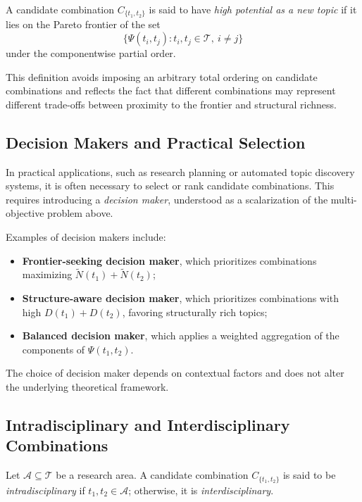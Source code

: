 \begin{definition}
A candidate combination $C_{\{t_1,t_2\}}$ is said to have \emph{high potential as a new topic} if it lies on the Pareto frontier of the set
\[
\{ \Psi(t_i,t_j) : t_i,t_j \in \mathcal{T},\ i \neq j \}
\]
under the componentwise partial order.
\end{definition}

\noindent
This definition avoids imposing an arbitrary total ordering on candidate combinations and reflects the fact that different combinations may represent different trade-offs between proximity to the frontier and structural richness.

\subsection{Decision Makers and Practical Selection}

In practical applications, such as research planning or automated topic discovery systems, it is often necessary to select or rank candidate combinations. This requires introducing a \emph{decision maker}, understood as a scalarization of the multi-objective problem above.

Examples of decision makers include:
\begin{itemize}
\item \textbf{Frontier-seeking decision maker}, which prioritizes combinations maximizing $\tilde{N}(t_1)+\tilde{N}(t_2)$;
\item \textbf{Structure-aware decision maker}, which prioritizes combinations with high $D(t_1)+D(t_2)$, favoring structurally rich topics;
\item \textbf{Balanced decision maker}, which applies a weighted aggregation of the components of $\Psi(t_1,t_2)$.
\end{itemize}

The choice of decision maker depends on contextual factors and does not alter the underlying theoretical framework.

\subsection{Intradisciplinary and Interdisciplinary Combinations}

\begin{definition}
Let $\mathcal{A} \subseteq \mathcal{T}$ be a research area. A candidate combination $C_{\{t_1,t_2\}}$ is said to be \emph{intradisciplinary} if $t_1,t_2 \in \mathcal{A}$; otherwise, it is \emph{interdisciplinary}.
\end{definition}

